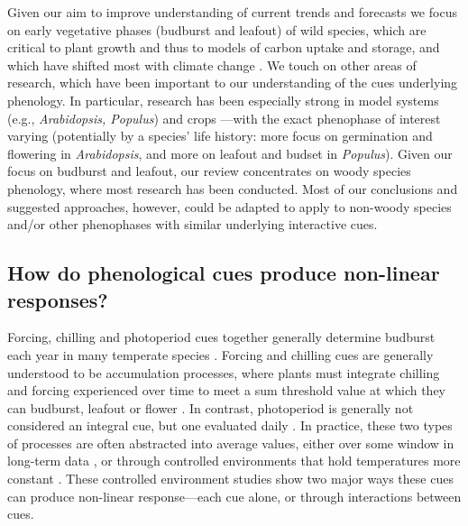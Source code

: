 \documentclass[11pt,letter]{article}
\begin{document}
Given our aim to improve understanding of current trends and forecasts we focus on early vegetative phases (budburst and leafout) of wild species, which are critical to plant growth and thus to models of carbon uptake and storage, and which have shifted most with climate change \citep{Cleland:2007or,IPCC:2014sm}. We touch on other areas of research, which have been important to our understanding of the cues underlying phenology. In particular, research has been especially strong in model systems (e.g., \emph{Arabidopsis, Populus}) and crops \citep{cesaraccio2004}---with the exact phenophase of interest varying (potentially by a species' life history: more focus on germination and flowering in \emph{Arabidopsis}, and more on leafout and budset in \emph{Populus}).  Given our focus on budburst and leafout, our review concentrates on woody species phenology, where most research has been conducted. Most of our conclusions and suggested approaches, however, could be adapted to apply to non-woody species and/or other phenophases with similar underlying interactive cues. \\

\subsection{How do phenological cues produce non-linear responses?}
Forcing, chilling and photoperiod cues together generally determine budburst each year in many temperate species \citep[e.g.,][]{chuinearees,ettinger2020}. Forcing and chilling cues are generally understood to be accumulation processes, where plants must integrate chilling and forcing experienced over time to meet a sum threshold value at which they can budburst, leafout or flower \citep{Chuine2000}. In contrast, photoperiod is generally not considered an integral cue, but one evaluated daily \citep{Singh:2017}. In practice, these two types of processes are often abstracted into average values, either over some window in long-term data \citep[e.g.,][]{Wolkovich:2012n,fu2015}, or through controlled environments that hold temperatures more constant \citep[e.g.,][]{Worrall:1967aa,Heide:1993,Heide:1993a,Skuterud:1994aa}. These controlled environment studies show two major ways these cues can produce non-linear response---each cue alone, or through interactions between cues. \\
\end{document}
